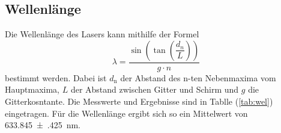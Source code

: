 \subsection{Wellenlänge}
\label{sec:wel}

Die Wellenlänge des Lasers kann mithilfe der Formel
\begin{equation}
  \lambda = \dfrac{\sin\left(\tan\left(\dfrac{d_n}{L}\right)\right)}{g \cdot n}
\end{equation}
bestimmt werden.
Dabei ist $d_\mathrm{n}$ der Abstand des n-ten Nebenmaxima vom Hauptmaxima, $L$ der Abstand zwischen Gitter und Schirm und $g$ die Gitterkosntante.
Die Messwerte und Ergebnisse sind in Tablle (\ref{tab:wel}) eingetragen.
Für die Wellenlänge ergibt sich so ein Mittelwert von \SI{633.845(425)}{\nano\meter}.


